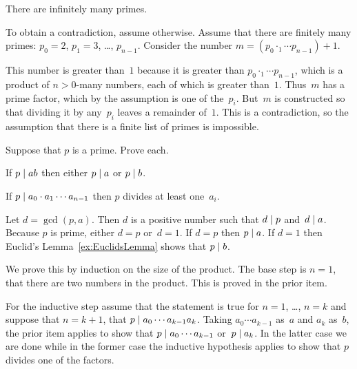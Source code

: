\documentclass{ibl}  %
\begin{document}
\begin{ex}
There are infinitely many primes.  
\begin{ans}
To obtain a contradiction, assume otherwise.
Assume that there are finitely many primes: 
$p_0=2$, $p_1=3$, \ldots, $p_{n-1}$.
Consider the number $m=(p_0\cdotp_1\cdots p_{n-1})+1$.

This number is greater than~$1$ because it is greater than 
$p_0\cdotp_1\cdots p_{n-1}$, 
which is a product of $n>0$-many numbers, each of which is greater than~$1$.
Thus~$m$ has a prime factor, which by the assumption is one of the~$p_i$.
But~$m$ is constructed so that dividing it by any~$p_i$ 
leaves a remainder of~$1$.
This is a contradiction, so the assumption that there is a finite
list of primes is impossible.
\end{ans}
\end{ex}

\begin{ex} Suppose that $p$ is a prime.  Prove each.\label{ex:EuclidsOtherLemma}
\begin{exes}
\item If  $p\mid ab$ then either $p\mid a$ or
$p\mid b$.
\item If $p\mid a_0\cdot a_1\cdots a_{n-1}$ then 
$p$ divides at least one~$a_i$.    
\end{exes}
\begin{ans}
\begin{exes}
\item Let $d=\gcd(p,a)$.
  Then $d$ is a positive number such that $d\mid p$ and~$d\mid a$.
  Because $p$ is prime, either $d=p$ or~$d=1$.
  If $d=p$ then $p\mid a$.
  If $d=1$ then Euclid's Lemma~\ref{ex:EuclidsLemma} shows that 
  $p\mid b$.
\item We prove this by induction on the size of the product.
  The base step is $n=1$, that there are two numbers in the product.
  This is proved in the prior item.

  For the inductive step assume that the statement is true for $n=1$, \ldots,
  $n=k$ and suppose that $n=k+1$, that $p\mid a_0\cdots a_{k-1}a_k$.
  Taking $a_0\cdots a_{k-1}$ as~$a$ and $a_k$ as~$b$, the prior item applies
  to show that $p\mid a_0\cdots a_{k-1}$ or~$p\mid a_k$.
  In the latter case we are done while in the former case the
  inductive hypothesis applies to show that $p$ divides one of the factors.
\end{exes}
\end{ans}
\end{ex}
\end{document}
